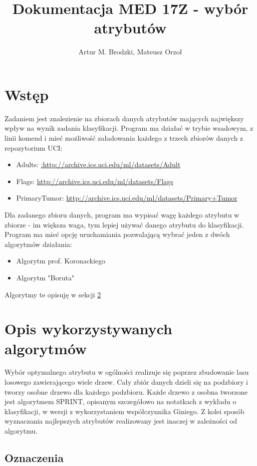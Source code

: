 \documentclass{article}
\title{Dokumentacja MED 17Z - wybór atrybutów}
\author{Artur M. Brodzki, Mateusz Orzoł}
\begin{document}
\maketitle

\section{Wstęp} \label{sec:intro}
Zadaniem jest znalezienie na zbiorach danych atrybutów mających największy wpływ na wynik zadania klasyfikacji. Program ma działać w trybie wsadowym, z linii komend i mieć możliwość załadowania każdego z trzech zbiorów danych z repozytorium UCI:
\begin{itemize}
	\item Adults: \url{:http://archive.ics.uci.edu/ml/datasets/Adult}
	\item Flags: \url{ http://archive.ics.uci.edu/ml/datasets/Flags}
	\item PrimaryTumor: \url{ http://archive.ics.uci.edu/ml/datasets/Primary+Tumor}
\end{itemize}

Dla zadanego zbioru danych, program ma wypisać wagę każdego atrybutu w zbiorze - im większa waga, tym lepiej używać danego atrybutu do klasyfikacji. Program ma mieć opcję uruchamiania pozwalającą wybrać jeden z dwóch algorytmów działania:
\begin{itemize}
	\item Algorytm prof. Koronackiego
	\item Algorytm "Boruta"
\end{itemize}
Algorytmy te opisuję w sekcji \ref{sec:algs}

\section{Opis wykorzystywanych algorytmów} \label{sec:algs}
Wybór optymalnego atrybutu w ogólności realizuje się poprzez zbudowanie lasu losowego zawierającego wiele drzew. Cały zbiór danych dzieli się na podzbiory i tworzy osobne drzewo dla każdego podzbioru. Każde drzewo z osobna tworzone jest algorytmem SPRINT, opisanym szczegółowo na notatkach z wykładu o klasyfikacji, w wersji z wykorzystaniem współczynnika Giniego. Z kolei sposób wyznaczania najlepszych atrybutów realizowany jest inaczej w zależności od algorytmu.

\subsection{Oznaczenia} \label{sec:symbols}
\end{document}
